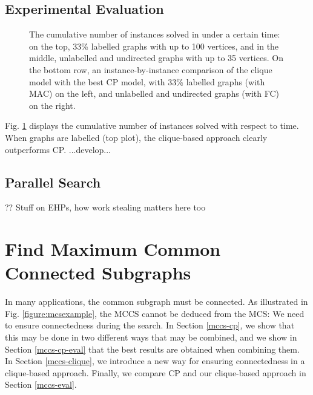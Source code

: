 \documentclass{llncs}
\begin{document}
\subsection{Experimental Evaluation}

\begin{figure}[p]
    \centering
    
    \vspace*{1em}

    \centering
    
    \caption{The cumulative number of instances solved in under a certain time: on the top, 33\%
        labelled graphs with up to 100 vertices, and in the middle, unlabelled and undirected graphs
        with up to 35 vertices. On the bottom row, an instance-by-instance comparison of the clique
        model with the best CP model, with 33\% labelled graphs (with MAC) on the left, and
        unlabelled and undirected graphs (with FC) on the right.} \label{figure:unconnected-cumulative}
\end{figure}

Fig. \ref{figure:unconnected-cumulative} displays the cumulative number of instances solved with respect to time.
When graphs are labelled (top plot), the clique-based approach clearly outperforms CP. ...develop...

\subsection{Parallel Search}

\cite{DBLP:journals/jcc/KoncDTRJ12,DBLP:journals/algorithms/McCreeshP13,DBLP:journals/topc/McCreeshP15,DBLP:journals/cor/SegundoLP16}

?? Stuff on EHPs, how work stealing matters here too \cite{DBLP:journals/jco/BatsynGMP14}

\section{Find Maximum Common Connected Subgraphs}\label{mccs}

In many applications, the common subgraph must be connected. As illustrated in Fig.
\ref{figure:mcsexample}, the MCCS cannot be deduced from the MCS: We need to ensure connectedness
during the search. In Section \ref{mccs-cp}, we show that this may be done in two different ways
that may be combined, and we show in Section \ref{mccs-cp-eval} that the best results are obtained
when combining them. In Section \ref{mccs-clique}, we introduce a new way for ensuring connectedness
in a clique-based approach. Finally, we compare CP and our clique-based approach in Section
\ref{mccs-eval}.
\end{document}
